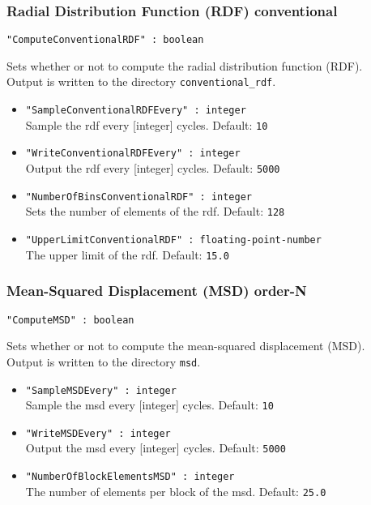 \subsubsection{Radial Distribution Function (RDF) conventional}
\begin{framed}
\verb+"ComputeConventionalRDF" : boolean+
\end{framed}
Sets whether or not to compute the radial distribution function (RDF).\\
Output is written to the directory \verb+conventional_rdf+.
\begin{itemize}
\item{\verb+"SampleConventionalRDFEvery" : integer+}\\
Sample the rdf every [integer] cycles. Default: \verb+10+
\item{\verb+"WriteConventionalRDFEvery" : integer+}\\
Output the rdf every [integer] cycles. Default: \verb+5000+
\item{\verb+"NumberOfBinsConventionalRDF" : integer+}\\
Sets the number of elements of the rdf. Default: \verb+128+
\item{\verb+"UpperLimitConventionalRDF" : floating-point-number+}\\
The upper limit of the rdf. Default: \verb+15.0+
\end{itemize}

\subsubsection{Mean-Squared Displacement (MSD) order-N}
\begin{framed}
\verb+"ComputeMSD" : boolean+
\end{framed}
Sets whether or not to compute the mean-squared displacement (MSD).\\
Output is written to the directory \verb+msd+.
\begin{itemize}
\item{\verb+"SampleMSDEvery" : integer+}\\
Sample the msd every [integer] cycles. Default: \verb+10+
\item{\verb+"WriteMSDEvery" : integer+}\\
Output the msd every [integer] cycles. Default: \verb+5000+
\item{\verb+"NumberOfBlockElementsMSD" : integer+}\\
The number of elements per block of the msd. Default: \verb+25.0+
\end{itemize}


